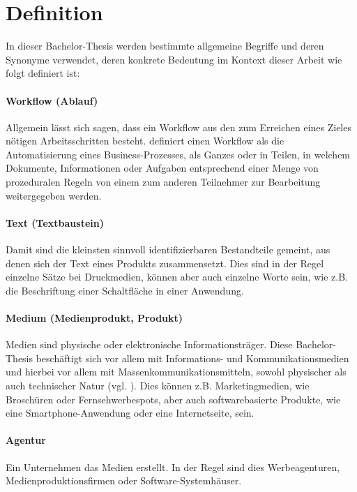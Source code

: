 \section{Definition}\label{l:def}

In dieser Bachelor-Thesis werden bestimmte allgemeine Begriffe und deren Synonyme verwendet, deren konkrete Bedeutung im Kontext dieser Arbeit wie folgt definiert ist:

\paragraph{Workflow (Ablauf)} Allgemein lässt sich sagen, dass ein Workflow aus den zum Erreichen eines Zieles nötigen Arbeitsschritten besteht. \cite[S.8]{wmc} definiert einen Workflow als die Automatisierung eines Business-Prozesses, als Ganzes oder in Teilen, in welchem Dokumente, Informationen oder Aufgaben entsprechend einer Menge von prozeduralen Regeln von einem zum anderen Teilnehmer zur Bearbeitung weitergegeben werden. 

\paragraph{Text (Textbaustein)} Damit sind die kleinsten sinnvoll identifizierbaren Bestandteile gemeint, aus denen sich der Text eines Produkts zusammensetzt. Dies sind in der Regel einzelne Sätze bei Druckmedien, können aber auch einzelne Worte sein, wie z.B. die Beschriftung einer Schaltfläche in einer Anwendung.

\paragraph{Medium (Medienprodukt, Produkt)} Medien sind physische oder elektronische Informationsträger. Diese Bachelor-Thesis beschäftigt sich vor allem mit Informations- und Kommunikationsmedien und hierbei vor allem mit Massenkommunikationsmitteln, sowohl physischer als auch technischer Natur (vgl. \cite[S.199--201]{schanze2002metzler}). Dies können z.B. Marketingmedien, wie Broschüren oder Fernsehwerbespots, aber auch softwarebasierte Produkte, wie eine Smartphone-Anwendung oder eine Internetseite, sein. 

\paragraph{Agentur} Ein Unternehmen das Medien erstellt. In der Regel sind dies Werbeagenturen, Medienproduktionsfirmen oder Software-Systemhäuser. 

